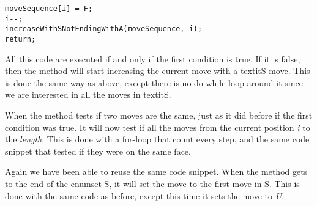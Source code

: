 \begin{verbatim}
moveSequence[i] = F;
i--;
increaseWithSNotEndingWithA(moveSequence, i);
return;
\end{verbatim}

All this code are executed if and only if the first condition is true.
If it is false, then the method will start increasing the current move with a textit{S} move.
This is done the same way as above, except there is no do-while loop around it since we are interested in all the moves in textit{S}.

When the method tests if two moves are the same, just as it did before if the first condition was true.
It will now test if all the moves from the current position \textit{i} to the \textit{length}.
This is done with a for-loop that count every step, and the same code snippet that tested if they were on the same face.

Again we have been able to reuse the same code snippet.
When the method gets to the end of the enumset S, it will set the move to the first move in S.
This is done with the same code as before, except this time it sets the move to \textit{U}.